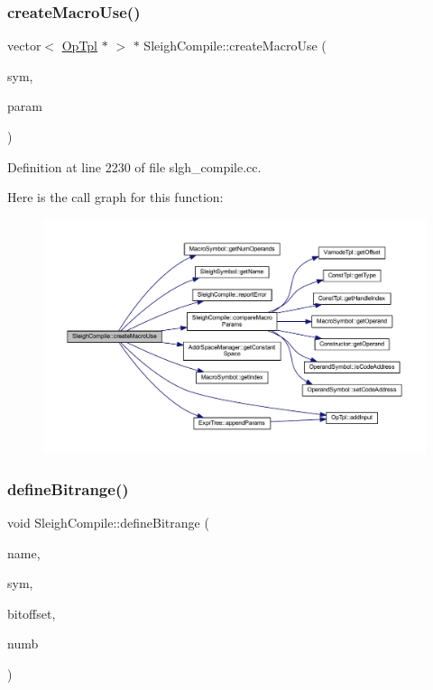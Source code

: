 \subsubsection{\texorpdfstring{createMacroUse()}{createMacroUse()}}
{\footnotesize\ttfamily vector$<$ \mbox{\hyperlink{class_op_tpl}{Op\+Tpl}} $\ast$ $>$ $\ast$ Sleigh\+Compile\+::create\+Macro\+Use (\begin{DoxyParamCaption}\item[{\mbox{\hyperlink{class_macro_symbol}{Macro\+Symbol}} $\ast$}]{sym,  }\item[{vector$<$ \mbox{\hyperlink{class_expr_tree}{Expr\+Tree}} $\ast$ $>$ $\ast$}]{param }\end{DoxyParamCaption})}



Definition at line 2230 of file slgh\+\_\+compile.\+cc.

Here is the call graph for this function\+:
\nopagebreak
\begin{figure}[H]
\begin{center}
\leavevmode
\includegraphics[width=350pt]{class_sleigh_compile_a9576fc0c7e5e7ed41b3adf76a31edd72_cgraph}
\end{center}
\end{figure}
\mbox{\label{class_sleigh_compile_a5bab7ee59435857526ed02fd3071f4d7}} 
\subsubsection{\texorpdfstring{defineBitrange()}{defineBitrange()}}
{\footnotesize\ttfamily void Sleigh\+Compile\+::define\+Bitrange (\begin{DoxyParamCaption}\item[{string $\ast$}]{name,  }\item[{\mbox{\hyperlink{class_varnode_symbol}{Varnode\+Symbol}} $\ast$}]{sym,  }\item[{uint4}]{bitoffset,  }\item[{uint4}]{numb }\end{DoxyParamCaption})}



